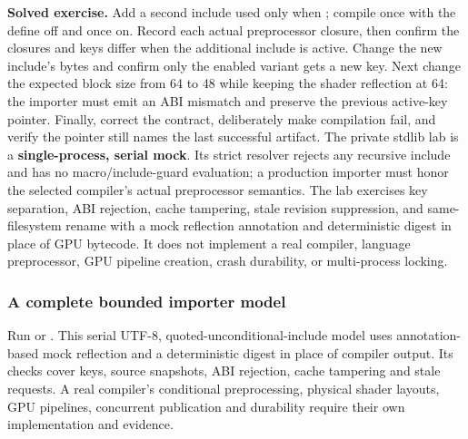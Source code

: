 \textbf{Solved exercise.} Add a second include used only when ; compile once with the define off and once on. Record each actual preprocessor closure, then confirm the closures and keys differ when the additional include is active. Change the new include's bytes and confirm only the enabled variant gets a new key. Next change the expected block size from 64 to 48 while keeping the shader reflection at 64: the importer must emit an ABI mismatch and preserve the previous active-key pointer. Finally, correct the contract, deliberately make compilation fail, and verify the pointer still names the last successful artifact. The private stdlib lab is a \textbf{single-process, serial mock}. Its strict resolver rejects any recursive include and has no macro/include-guard evaluation; a production importer must honor the selected compiler's actual preprocessor semantics. The lab exercises key separation, ABI rejection, cache tampering, stale revision suppression, and same-filesystem rename with a mock reflection annotation and deterministic digest in place of GPU bytecode. It does not implement a real compiler, language preprocessor, GPU pipeline creation, crash durability, or multi-process locking.

\subsubsection{A complete bounded importer model}\label{05-engine-i-ch010-a-complete-bounded-importer-model}

\hypertarget{05-engine-i-ch010-a-complete-bounded-importer-model}{}

Run  or . This serial UTF-8, quoted-unconditional-include model uses annotation-based mock reflection and a deterministic digest in place of compiler output. Its checks cover keys, source snapshots, ABI rejection, cache tampering and stale requests. A real compiler's conditional preprocessing, physical shader layouts, GPU pipelines, concurrent publication and durability require their own implementation and evidence.

